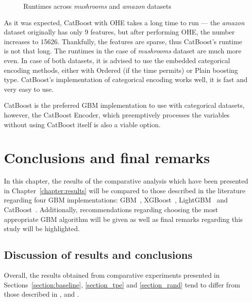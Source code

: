\documentclass[magisterska, english]{pwr_wmat_praca_dyplomowa}
\theoremstyle{plain}
\numberwithin{theorem}{chapter}
\theoremstyle{definition}
\numberwithin{theorem}{chapter}
\begin{document}
\begin{figure}[H]
	\centering
	\caption{Runtimes across \emph{mushrooms} and \emph{amazon} datasets}
	\label{fig:catboost_categorical_runtimes}
\end{figure}

As it was expected, CatBoost with OHE takes a long time to run --- the \emph{amazon} dataset originally has only 9 features, but after performing OHE, the number increases to 15626. Thankfully, the features are sparse, thus CatBoost's runtime is not that long. The runtimes in the case of \emph{mushrooms} dataset are much more even. In case of both datasets, it is advised to use the embedded categorical encoding methods, either with Ordered (if the time permits) or Plain boosting type. CatBoost's implementation of categorical encoding works well, it is fast and very easy to use.

CatBoost is the preferred GBM implementation to use with categorical datasets, however, the CatBoost Encoder, which preemptively processes the variables without using CatBoost itself is also a viable option.

\chapter{Conclusions and final remarks}\label{chapter:conclusions}
In this chapter, the results of the comparative analysis which have been presented in Chapter~\ref{chapter:results} will be compared to those described in the literature regarding four GBM implementations: GBM~\cite{friedman_gbm}, XGBoost~\cite{xgboost}, LightGBM~\cite{lightgbm} and CatBoost~\cite{catboost}. Additionally, recommendations regarding choosing the most appropriate GBM algorithm will be given as well as final remarks regarding this study will be highlighted.

\section{Discussion of results and conclusions}
Overall, the results obtained from comparative experiments presented in Sections~\ref{section:baseline}, \ref{section_tpe} and \ref{section_rand} tend to differ from those described in \cite{comparative_analysis}, \cite{competitive_analysis} and \cite{comparison_of}.
\end{document}
